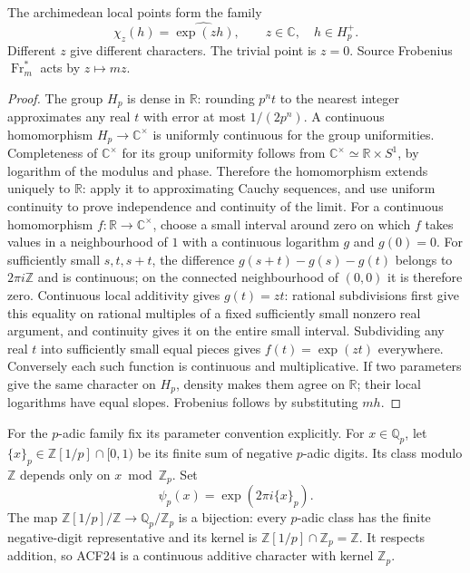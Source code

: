 \begin{proposition}
The archimedean local points form the family
\begin{equation}\tag{ACF23}
 \chi_z(h)=\widehat{\exp(zh)},\qquad z\in\mathbb C,\quad h\in H_p^+.
\end{equation}
Different $z$ give different characters. The trivial point is $z=0$.
Source Frobenius $\operatorname{Fr}_m^*$ acts by $z\mapsto mz$.
\end{proposition}
\begin{proof}
The group $H_p$ is dense in $\mathbb R$: rounding $p^n t$ to the nearest
integer approximates any real $t$ with error at most $1/(2p^n)$.
A continuous homomorphism $H_p\to\mathbb C^\times$ is uniformly
continuous for the group uniformities. Completeness of
$\mathbb C^\times$ for its group uniformity follows from
$\mathbb C^\times\simeq\mathbb R\times S^1$, by logarithm of the modulus
and phase. Therefore the homomorphism extends uniquely to $\mathbb R$:
apply it to approximating Cauchy sequences, and use uniform continuity
to prove independence and continuity of the limit.
For a continuous homomorphism $f:\mathbb R\to\mathbb C^\times$, choose a
small interval around zero on which $f$ takes values in a neighbourhood
of $1$ with a continuous logarithm $g$ and $g(0)=0$.
For sufficiently small $s,t,s+t$, the difference
$g(s+t)-g(s)-g(t)$ belongs to $2\pi i\mathbb Z$ and is continuous;
on the connected neighbourhood of $(0,0)$ it is therefore zero.
Continuous local additivity gives $g(t)=zt$: rational subdivisions
first give this equality on rational multiples of a fixed sufficiently
small nonzero real argument, and continuity gives it on the entire
small interval. Subdividing any real $t$ into sufficiently small equal
pieces gives $f(t)=\exp(zt)$ everywhere. Conversely each such function
is continuous and multiplicative. If two parameters give the same
character on $H_p$, density makes them agree on $\mathbb R$;
their local logarithms have equal slopes. Frobenius follows by
substituting $mh$.
\end{proof}

For the $p$-adic family fix its parameter convention explicitly.
For $x\in\mathbb Q_p$, let $\{x\}_p\in\mathbb Z[1/p]\cap[0,1)$ be its
finite sum of negative $p$-adic digits. Its class modulo $\mathbb Z$
depends only on $x\bmod\mathbb Z_p$. Set
\begin{equation}\tag{ACF24}
 \psi_p(x)=\exp(2\pi i\{x\}_p).
\end{equation}
The map $\mathbb Z[1/p]/\mathbb Z\to\mathbb Q_p/\mathbb Z_p$ is a
bijection: every $p$-adic class has the finite negative-digit
representative and its kernel is
$\mathbb Z[1/p]\cap\mathbb Z_p=\mathbb Z$.
It respects addition, so ACF24 is a continuous additive character
with kernel $\mathbb Z_p$.

